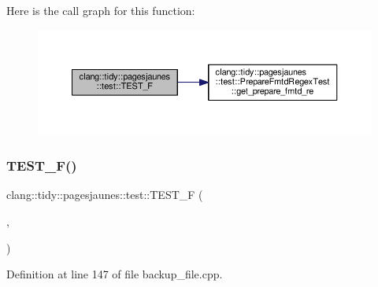 Here is the call graph for this function\+:
\nopagebreak
\begin{figure}[H]
\begin{center}
\leavevmode
\includegraphics[width=350pt]{namespaceclang_1_1tidy_1_1pagesjaunes_1_1test_a04a3722c20f4f679ebd39cac4a0af451_cgraph}
\end{center}
\end{figure}
\mbox{\label{namespaceclang_1_1tidy_1_1pagesjaunes_1_1test_ac6667fa9525cf83fa96849105b98ac8e}} 
\subsubsection{\texorpdfstring{T\+E\+S\+T\+\_\+\+F()}{TEST\_F()}\hspace{0.1cm}{\footnotesize\ttfamily [35/57]}}
{\footnotesize\ttfamily clang\+::tidy\+::pagesjaunes\+::test\+::\+T\+E\+S\+T\+\_\+F (\begin{DoxyParamCaption}\item[{\hyperlink{classclang_1_1tidy_1_1pagesjaunes_1_1test_1_1_backup_file}{Backup\+File}}]{,  }\item[{Simple\+Backup}]{ }\end{DoxyParamCaption})}



Definition at line 147 of file backup\+\_\+file.\+cpp.

